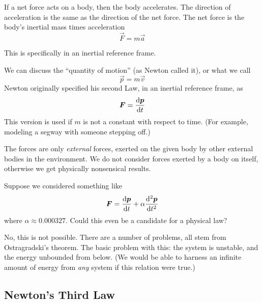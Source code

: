 \label{M:newton:second}
If a net force acts on a body, then the body accelerates. The direction
of acceleration is the same as the direction of the net force. The net
force is the body's inertial mass times acceleration
\begin{equation}
  \vec{F} = m\vec{a}
\end{equation}
\begin{rmk}
  This is specifically in an inertial reference frame.
\end{rmk}
\begin{rmk}
  We can discuss the ``quantity of motion'' (as Newton called it), or
  what we call 
  \begin{equation}
    \vec{p} = m\vec{v}
  \end{equation}
  Newton originally specified his second Law, in an inertial reference
  frame, as
  \begin{equation}
    \vec{F} = \frac{\D\vec{p}}{\D t}
  \end{equation}
  This version is used if $m$ is not a constant with respect to
  time. (For example, modeling a segway with someone stepping off.)
\end{rmk}
\begin{rmk}
The forces are only \emph{external} forces, exerted on the given body by
other external bodies in the environment. We do not consider forces
exerted by a body on itself, otherwise we get physically nonsensical
results.
\end{rmk}

Suppose we considered something like
\begin{equation}
\vec{F} = \frac{\D\vec{p}}{\D t} + \alpha\frac{\D^{2}\vec{p}}{\D t^{2}}
\end{equation}
where $\alpha\approx 0.000327$. Could this even be a candidate for a
physical law?

No, this is not possible. There are a number of problems, all stem from
Ostragradski's theorem. The basic problem with this: the system is
unstable, and the energy unbounded from below. (We would be able to
harness an infinite amount of energy from \emph{any} system if this
relation were true.)

\subsection{Newton's Third Law}
